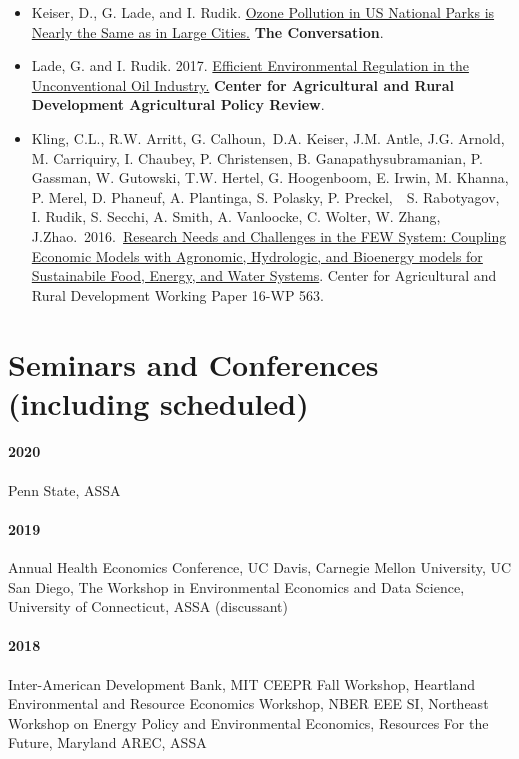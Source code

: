 \documentclass{res} %
\begin{document}
\begin{resume}
\begin{itemize} %
	\item[] Keiser, D., G. Lade, and I. Rudik. \href{https://theconversation.com/ozone-pollution-in-us-national-parks-is-nearly-the-same-as-in-large-cities-100148}{Ozone Pollution in US National Parks is Nearly the Same as in Large Cities.} \textbf{The Conversation}.
	\item[] Lade, G. and I. Rudik. 2017. \href{https://www.card.iastate.edu/ag_policy_review/display.aspx?id=70}{Efficient Environmental Regulation in the Unconventional Oil Industry.} \textbf{Center for Agricultural and Rural Development Agricultural Policy Review}.
	\item[] Kling, C.L., R.W. Arritt, G. Calhoun, D.A. Keiser, J.M. Antle, J.G. Arnold, M. Carriquiry, I. Chaubey, P. Christensen, B. Ganapathysubramanian, P. Gassman, W. Gutowski, T.W. Hertel, G. Hoogenboom, E. Irwin, M. Khanna, P. Merel, D. Phaneuf, A. Plantinga, S. Polasky, P. Preckel,  S. Rabotyagov, I. Rudik, S. Secchi, A. Smith, A. Vanloocke, C. Wolter, W. Zhang, J.Zhao. 2016. \href{http://www.card.iastate.edu/products/publications/pdf/16wp563.pdf}{Research Needs and Challenges in the FEW System: Coupling Economic Models with Agronomic, Hydrologic, and Bioenergy models for Sustainabile Food, Energy, and Water Systems}. Center for Agricultural and Rural Development Working Paper 16-WP 563.
\end{itemize}
\vspace{-.075in}
\section{Seminars and Conferences (including scheduled)}\vspace{-.1in}
\paragraph{2020} Penn State, ASSA \vspace{-.3in}
\paragraph{2019} Annual Health Economics Conference, UC Davis, Carnegie Mellon University, UC San Diego, The Workshop in Environmental Economics and Data Science, University of Connecticut, ASSA (discussant) \vspace{-.3in}
\paragraph{2018} Inter-American Development Bank, MIT CEEPR Fall Workshop, Heartland Environmental and Resource Economics Workshop, NBER EEE SI, Northeast Workshop on Energy Policy and Environmental Economics, Resources For the Future, Maryland AREC, ASSA \vspace{-.3in}

\end{resume}
\end{document}
